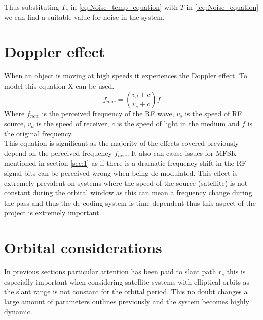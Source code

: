 \documentclass[conference]{IEEEtran}
\begin{document}
Thus substituting $T_s$ in \ref{eq:Noise_temp_equation} with $T$ in \ref{:eq:Noise_equation} we can find a suitable value for noise in the system.

\label{sec:5}


\section{Doppler effect}
When an object is moving at high speeds it experiences the Doppler effect. To model this equation X can be used. 
\begin{equation}
f_{new} =(\frac{v_d+c}{v_s+c})f
\label{eq:Doppler_effect_equation}
\end{equation}
Where $f_{new}$ is the perceived frequency of the RF wave, $v_s$ is the speed of RF source, $v_d$ is the speed of receiver, $c$ is the speed of light in the medium and $f$ is the original frequency.\\

This equation is significant as the majority of the effects covered previously depend on the perceived frequency $f_{new}$. It also can cause issues for MFSK mentioned in section \ref{sec:1} as if there is a dramatic frequency shift in the RF signal bits can be perceived wrong when being de-modulated. This effect is extremely prevalent on systems where the speed of the source (satellite) is not constant during the orbital window as this can mean a frequency change during the pass and thus the de-coding system is time dependent thus this aspect of the project is extremely important.
\label{sec:6}

\section{Orbital considerations}
In previous sections particular attention has been paid to slant path $r_s$ this is especially important when considering satellite systems with elliptical orbits as the slant range is not constant for the orbital period. This no doubt changes a large amount of parameters outlines previously and the system becomes highly dynamic. 
\label{sec:7}


\end{document}
